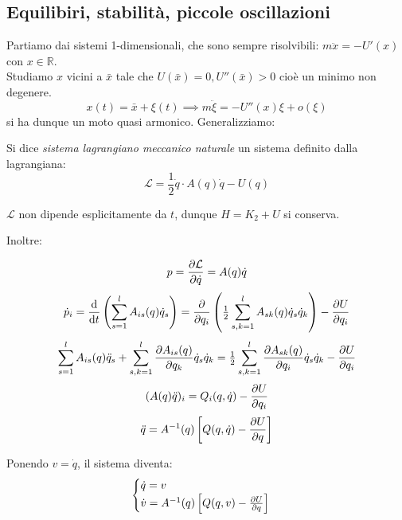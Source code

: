 \subsection{Equilibiri, stabilità, piccole oscillazioni}
Partiamo dai sistemi 1-dimensionali, che sono sempre risolvibili: $m\ddot{x} = - U'(x)$ con $x \in \mathbb{R}$.\\
Studiamo $x $ vicini a $\bar{x}$ tale che $U(\bar{x})=0, U''(\bar{x})>0$ cioè un minimo non degenere.
\begin{equation}
    x(t)= \bar{x}+ \xi(t)\implies m\ddot{\xi}= - U''(x)\xi + o(\xi)
\end{equation}
si ha dunque un moto quasi armonico.
Generalizziamo:
\begin{definition}
    Si dice \textit{sistema lagrangiano meccanico naturale} un sistema definito dalla lagrangiana:
    \begin{equation}
        \mathcal{L} = \frac{1}{2}\dot{q}\cdot A(q)\dot{q}- U (q)
    \end{equation}
\end{definition}
\begin{remark}
    $\mathcal{L}$ non dipende esplicitamente da $t$, dunque $H = K_2+ U$ si conserva.
\end{remark}
Inoltre:

\begin{equation}
    p = \pdv{\mathcal{L}}{\dot{q}} = A(q)\dot{q}
\end{equation}
\begin{equation}
    \dot{p}_i = \dv{t}\left( \sum_{s=1}^l A_{is}(q)\dot{q}_s \right)
    = \pdv{}{q_i}\left( \tfrac{1}{2}\sum_{s,k=1}^l A_{sk}(q)\dot{q}_s \dot{q}_k \right) - \pdv{U}{q_i}
\end{equation}
\begin{equation}
    \sum_{s=1}^l A_{is}(q)\ddot{q}_s
    + \sum_{s,k=1}^l \pdv{A_{is}(q)}{q_k}\dot{q}_s\dot{q}_k
    = \tfrac{1}{2}\sum_{s,k=1}^l \pdv{A_{sk}(q)}{q_i}\dot{q}_s\dot{q}_k - \pdv{U}{q_i}
\end{equation}
\begin{equation}
    (A(q)\ddot{q})_i = Q_i(q,\dot{q}) - \pdv{U}{q_i}
\end{equation}
\begin{equation}
    \ddot{q} = A^{-1}(q)\left[ Q(q,\dot{q}) - \pdv{U}{q} \right]
\end{equation}

Ponendo $v = \dot{q}$, il sistema diventa:
\begin{equation}
\begin{cases}
    \dot{q} = v \\
    \dot{v} = A^{-1}(q)\left[ Q(q,v) - \pdv{U}{q} \right]
\end{cases}
\end{equation}

